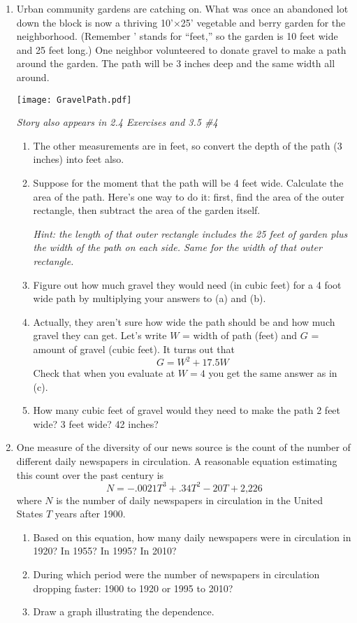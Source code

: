 \begin{enumerate}
\item Urban community gardens are catching on.  What was once an abandoned lot down the block is now a thriving 10'$\times$25' vegetable and berry garden for the neighborhood. (Remember ' stands for ``feet,'' so the garden is 10 feet wide and 25 feet long.)  One neighbor volunteered to donate gravel to make a path around the garden.  The path will be 3 inches deep and the same width all around. 
\begin{center}
\scalebox {.4} {\texttt{[image: GravelPath.pdf]}}
\end{center}
 \hfill \emph{Story also appears in 2.4 Exercises and 3.5 \#4}
\begin{enumerate}
\item The other measurements are in feet, so convert the depth of the path (3 inches) into feet also.  
\item Suppose for the moment that the path will be 4 feet wide. Calculate the area of the path.  Here's one way to do it:  first, find the area of the outer rectangle, then subtract the area of the garden itself.

\emph{Hint:  the length of that outer rectangle includes the 25 feet of garden plus the width of the path on each side.   Same for the width of that outer rectangle.}
\item Figure out how much gravel they would need  (in cubic feet) for a 4 foot wide path by multiplying your answers to (a) and (b). 
\item  Actually, they aren't sure how wide the path should be and how much gravel they can get.  Let's write $W$ = width of path (feet) and $G$ = amount of gravel (cubic feet).  It turns out that $$G = W^2 + 17.5W$$
Check that when you evaluate at $W=4$ you get the same answer as in (c).
\item How many cubic feet of gravel would they need to make the path 2 feet wide? 3 feet wide?  42 inches? 
\end{enumerate}

\item One measure of the diversity of our news source is the count of the number of different daily newspapers in circulation.  A reasonable equation estimating this count over the past century is $$N = -.0021T^3+.34T^2-20T+ \text{2,226}$$ where $N$ is the number of daily newspapers in circulation in the United States $T$ years after 1900.
\begin{enumerate}
\item Based on this equation, how many daily newspapers were in circulation in 1920?  In 1955?  In 1995?  In 2010?
\item During which period were the number of newspapers in circulation dropping faster:  1900 to 1920 or 1995 to 2010?
\item Draw a graph illustrating the dependence.
\end{enumerate}


\end{enumerate}
